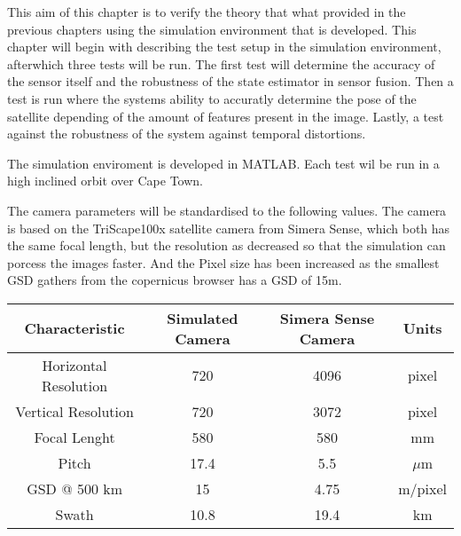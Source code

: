\label{chap:experiment}

\label{sec:expintro}

This aim of this chapter is to verify the theory that what provided in the previous chapters using the simulation environment that is developed. This chapter will
begin with describing the test setup in the simulation environment, afterwhich three tests will be run. The first test will determine the accuracy of the sensor
itself and the robustness of the state estimator in sensor fusion. Then a test is run where the systems ability to accuratly determine the pose of the satellite depending of the amount of features present in the image. Lastly, a test against the robustness of the system against temporal distortions.

\label{sec:BaseTest}

The simulation enviroment is developed in MATLAB. Each test wil be run in a high inclined orbit over Cape Town.
\vspace{0.5cm}

\noindent
The camera parameters will be standardised to the following values. The camera is based on the TriScape100x satellite camera from Simera Sense, which both has the same focal length, but the resolution as decreased so that the simulation can porcess the images faster. And the Pixel size has been increased as the smallest GSD gathers from the copernicus browser has a GSD of 15m.

\begin{table}
    \begin{center}
        \begin{tabular}{|c|c|c|c|}
        \hline
        Characteristic          & Simulated Camera & Simera Sense Camera & Units \\
        \hline
        Horizontal Resolution   & 720   & 4096      & pixel \\
        Vertical Resolution     & 720   & 3072      & pixel \\
        Focal Lenght            & 580   & 580       & mm \\
        Pitch                   & 17.4  & 5.5       & $\mu$m \\
        GSD @ 500 km            & 15    & 4.75      & m/pixel \\
        Swath                   & 10.8  & 19.4      & km \\
        \hline
        \end{tabular}
    \end{center}
\end{table}

